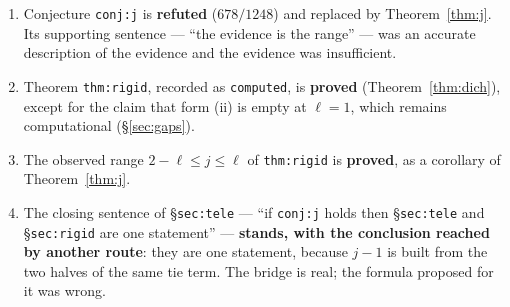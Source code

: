 \documentclass[11pt]{article}
\theoremstyle{definition}
\theoremstyle{remark}
\begin{document}
\begin{enumerate}
\item Conjecture \texttt{conj:j} is \textbf{refuted} ($678/1248$) and replaced by
Theorem~\ref{thm:j}. Its supporting sentence --- ``the evidence is the range'' --- was an
accurate description of the evidence and the evidence was insufficient.
\item Theorem \texttt{thm:rigid}, recorded as \texttt{computed}, is \textbf{proved}
(Theorem~\ref{thm:dich}), except for the claim that form (ii) is empty at $\ell=1$, which
remains computational (\S\ref{sec:gaps}).
\item The observed range $2-\ell\le j\le\ell$ of \texttt{thm:rigid} is \textbf{proved},
as a corollary of Theorem~\ref{thm:j}.
\item The closing sentence of \S\texttt{sec:tele} --- ``if \texttt{conj:j} holds then
\S\texttt{sec:tele} and \S\texttt{sec:rigid} are one statement'' --- \textbf{stands, with
the conclusion reached by another route}: they are one statement, because $j-1$ is built
from the two halves of the same tie term. The bridge is real; the formula proposed for
it was wrong.
\end{enumerate}
\end{document}
